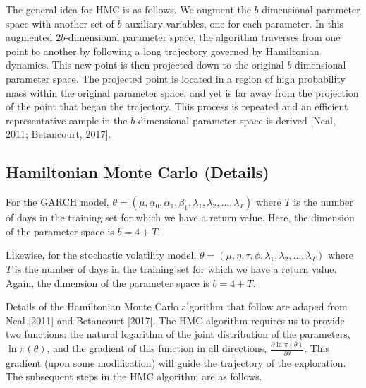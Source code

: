 \documentclass[12pt,letterpaper,reqno,fleqn]{article}
\begin{document}
The general idea for HMC is as follows. We augment the $b$-dimensional parameter space with another set of $b$ auxiliary variables, one for each parameter. In this augmented $2b$-dimensional parameter space, the algorithm traverses from one point to another by following a long trajectory governed by Hamiltonian dynamics. This new point is then projected down to the original $b$-dimensional parameter space. The projected point is located in a region of high probability mass within the original parameter space, and yet is far away from the projection of the point that began the trajectory. This process is repeated and an efficient representative sample in the $b$-dimensional parameter space is derived [Neal, 2011; Betancourt, 2017]. 

\subsection{Hamiltonian Monte Carlo (Details)}
For the GARCH model, $\theta = (\mu, \alpha_0, \alpha_1, \beta_1, \lambda_1, \lambda_2, ... , \lambda_T)$ where $T$ is the number of days in the training set for which we have a return value. Here, the dimension of the parameter space is $b = 4 + T$. 

Likewise, for the stochastic volatility model, $\theta = (\mu, \eta, \tau, \phi, \lambda_1, \lambda_2, ... , \lambda_T)$ where $T$ is the number of days in the training set for which we have a return value. Again, the dimension of the parameter space is $b = 4 + T$.

Details of the Hamiltonian Monte Carlo algorithm that follow are adaped from Neal [2011] and Betancourt [2017]. The HMC algorithm requires us to provide two functions: the natural logarithm of the joint distribution of the parameters, $\ln\pi(\theta)$, and the gradient of this function in all directions, $\frac{\partial \ln\pi(\theta)}{\partial \theta}$. This gradient (upon some modification) will guide the trajectory of the exploration. The subsequent steps in the HMC algorithm are as follows.
\end{document}
